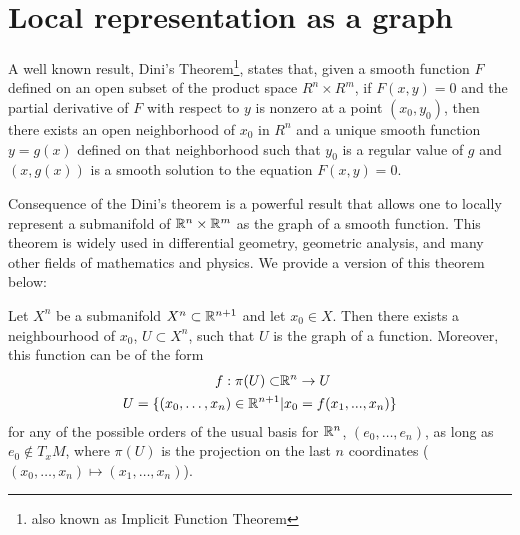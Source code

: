 




\section{Local representation as a graph}

A well known result, Dini's Theorem\footnote{also known as Implicit Function Theorem}, states that, given a smooth function $F$ defined on an open subset of the product space $R^n \times R^m$, if $F(x,y) = 0$ and the partial derivative of $F$ with respect to $y$ is nonzero at a point $(x_0, y_0)$, then there exists an open neighborhood of $x_0$ in $R^n$ and a unique smooth function $y = g(x)$ defined on that neighborhood such that $y_0$ is a regular value of $g$ and $(x, g(x))$ is a smooth solution to the equation $F(x, y) = 0$.

Consequence of the Dini's theorem is a powerful result that allows one to locally represent a submanifold of $\mathbb{R}^n \times \mathbb{R}^m$ as the graph of a smooth function. This theorem is widely used in differential geometry, geometric analysis, and many other fields of mathematics and physics. We provide a version of this theorem below:

\begin{theorem}
	Let $X^n$ be a submanifold $X^n\subset\mathbb{R}^{n+1}$ and let $x_0\in X$. Then there exists a neighbourhood of $x_0$, $U\subset X^n$, such that $U$ is the graph of a function. 
	Moreover, this function can be of the form 
	\begin{align*}
		f:\pi(U)\subset&\mathbb{R}^n\rightarrow U \\
		U=\{(x_0, \dots, x_n)\in \mathbb{R}^{n+1}&|x_0= f(x_1, ..., x_n)\}
	\end{align*}
	for any of the possible orders of the usual basis for $\mathbb{R}^n$, $(e_0, \dots, e_n)$, as long as $e_0\notin T_xM$, where $\pi(U)$ is the projection on the last $n$ coordinates ($(x_0, \dots, x_n) \mapsto (x_1, \dots, x_n)$). \label{localgraphclassic}
\end{theorem}

